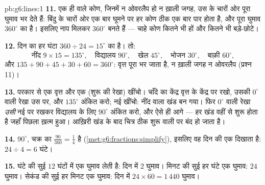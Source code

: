 \begin{solution}{pb:g6:lines:1}
\textbf{11.} एक ही  वाले कोण, जिनमें न ओवरलैप हो न ख़ाली
जगह, उस  के चारों ओर पूरा घुमाव भर देते हैं: बिंदु के चारों
ओर एक बार घूमने पर हर कोण ठीक एक बार पार होता है, और पूरा घुमाव
$360^\circ$ का है। इसलिए नाप मिलकर $360^\circ$ बनते हैं ---
चाहे कोण कितने भी हों और कितने भी बड़े-छोटे।

\textbf{12.} दिन का हर घंटा
$360 \div 24 = 15^\circ$ का है। तो:
\[
\text{नींद } 9 \times 15 = 135^\circ, \quad
\text{विद्यालय } 90^\circ, \quad
\text{खेल } 45^\circ, \quad
\text{भोजन } 30^\circ, \quad
\text{बाक़ी } 60^\circ,
\]
और $135 + 90 + 45 + 30 + 60 = 360^\circ$: वृत्त पूरा भर जाता
है, न ख़ाली जगह न ओवरलैप (प्रश्न 11)।

\textbf{13.} परकार से एक वृत्त और एक  (शुरू की रेखा)
खींचो। चाँदे का केंद्र वृत्त के केंद्र पर रखो, उसकी $0^\circ$
वाली रेखा उस  पर, और $135^\circ$ अंकित करो; नई 
खींचो: नींद वाला खंड बन गया। फिर $0^\circ$ वाली रेखा \emph{उसी}
नई  पर रखकर विद्यालय के लिए $90^\circ$ अंकित करो, और ऐसे
ही आगे --- हर खंड वहीं से शुरू होता है जहाँ पिछला ख़त्म हुआ।
आख़िरी खंड के बाद चित्र ठीक शुरू वाली  पर बंद हो जाता है।

\textbf{14.} $90^\circ$, चक्र का $\frac{90}{360} = \frac14$ है
(\cref{met:g6:fractions:simplify}), इसलिए वह दिन की एक 
दिखाता है: $24 \div 4 = 6$ घंटे।

\textbf{15.} घंटे की सुई $12$ घंटों में एक घुमाव लेती है: दिन
में $2$ घुमाव। मिनट की सुई हर घंटे एक घुमाव: $24$ घुमाव।
सेकंड की सुई हर मिनट एक घुमाव: दिन में $24 \times 60 = 1\,440$
घुमाव।

\end{solution}
